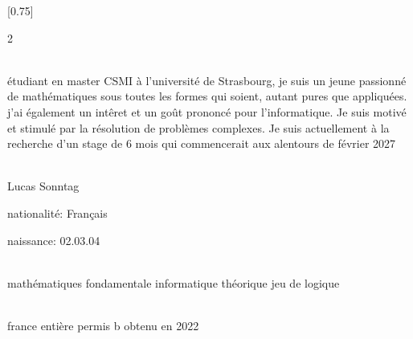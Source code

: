 \documentclass[verylight]{simplehipstercv}
\begin{document}
\setlength{\columnsep}{1.5cm}
[0.75]
\begin{paracol}{2}

\paracolbackgroundoptions



\footnotesize
{\setasidefontcolour
\flushright
\begin{center}
\end{center}

\\[0.5em]

{\footnotesize
étudiant en master CSMI à l'université de Strasbourg,
je suis un jeune passionné de mathématiques sous toutes les formes qui soient, autant pures que appliquées. j'ai également un intêret et un goût prononcé pour l'informatique.
Je suis motivé et stimulé par la résolution de problèmes complexes.
Je suis actuellement à la recherche d'un stage de 6 mois qui commencerait aux alentours de février 2027}
\bigskip

 \\[0.5em]
Lucas Sonntag   

nationalité: Français 

naissance: 02.03.04

\bigskip

\\[0.5em]

mathématiques fondamentale
informatique théorique
jeu de logique

\bigskip

\\[0.5em]

france entière
permis b obtenu en 2022

\bigskip


\vspace{4em}


\phantom{turn the page}


}
\switchcolumn

\small


\end{paracol}
\end{document}
